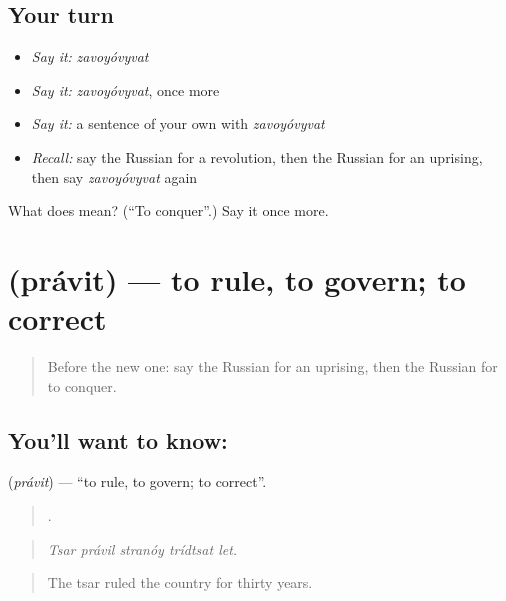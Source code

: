 \subsection*{Your turn}
\begin{itemize}
\raggedright
  \item \emph{Say it:} \emph{zavoyóvyvat}
  \item \emph{Say it:} \emph{zavoyóvyvat}, once more
  \item \emph{Say it:} a sentence of your own with \emph{zavoyóvyvat}
  \item \emph{Recall:} say the Russian for a revolution, then the Russian for an uprising, then say \emph{zavoyóvyvat} again
\end{itemize}

\begin{tcolorbox}[breakable,colback=teal!4,colframe=teal!35!black,title={Before you move on}]
What does  mean? (\textquotedblleft{}To conquer\textquotedblright{}.) Say it once more.
\end{tcolorbox}
\section[\texorpdfstring{\ru{править} (právit)}{править (právit)}]{ (právit) — to rule, to govern; to correct}

\label{lesson:RU-C325-pravit}



\begin{quote}
Before the new one: say the Russian for an uprising, then the Russian for to conquer.
\end{quote}

\subsection*{You'll want to know: }
\textbf{} (\emph{právit}) — \textquotedblleft{}to rule, to govern; to correct\textquotedblright{}.

\begin{quote}
    .
\end{quote}

\begin{quote}
\emph{Tsar právil stranóy trídtsat let.}
\end{quote}

\begin{quote}
The tsar ruled the country for thirty years.
\end{quote}


